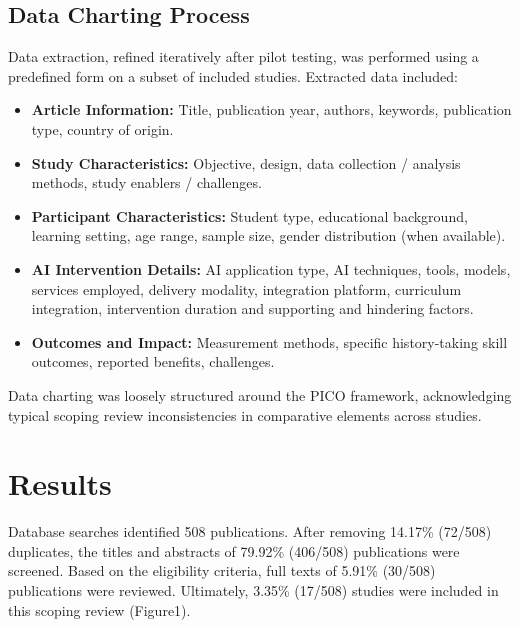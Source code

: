 \subsection{Data Charting Process}

Data extraction, refined iteratively after pilot testing, was performed using a predefined form on a subset of included studies. Extracted data included:

\begin{itemize}
    \item \textbf{Article Information:} Title, publication year, authors, keywords, publication type, country of origin.
    \item \textbf{Study Characteristics:} Objective, design, data collection / analysis methods, study enablers / challenges.
    \item \textbf{Participant Characteristics:} Student type, educational background, learning setting, age range, sample size, gender distribution (when available).
    \item \textbf{AI Intervention Details:} AI application type, AI techniques, tools, models, services employed, delivery modality, integration platform, curriculum integration, intervention duration and supporting and hindering factors.
    \item \textbf{Outcomes and Impact:} Measurement methods, specific history-taking skill outcomes, reported benefits, challenges.
\end{itemize}

Data charting was loosely structured around the PICO framework, acknowledging typical scoping review inconsistencies in comparative elements across studies.

\section{Results}

Database searches identified 508 publications. After removing 14.17\% (72/508) duplicates, the titles and abstracts of 79.92\% (406/508) publications were screened. Based on the eligibility criteria, full texts of 5.91\% (30/508) publications were reviewed. Ultimately, 3.35\% (17/508) studies were included in this scoping review (Figure1).

